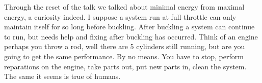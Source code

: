 \documentclass[12pt]{amsart}
\theoremstyle{conjecture}
\theoremstyle{definition}
\theoremstyle{question}
\theoremstyle{theorem}
\begin{document}
\begin{onehalfspace}
        Through the reset of the talk we talked about minimal energy from maximal energy, a curiosity indeed.
        I suppose a system run at full throttle can only maintain itself for so long before buckling.
        After buckling a system can continue to run, but needs help and fixing after buckling has occurred.
        Think of an engine perhaps you throw a rod, well there are 5 cylinders still running, but are you going to
        get the same performance.
        By no means.
        You have to stop, perform reparations on the engine, take parts out, put new parts in, clean the system.
        The same it seems is true of humans.
    \end{onehalfspace}
\end{document}
